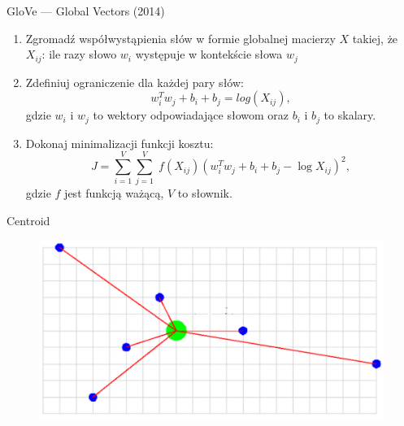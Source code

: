 \documentclass{beamer}
\begin{document}
	\begin{frame}{GloVe --- Global Vectors (2014)}


\begin{enumerate}
	\item Zgromadź współwystąpienia słów w formie globalnej macierzy $X$ takiej, że
	$X_{ij}$: ile razy słowo $w_i$ występuje w kontekście słowa $w_j$

	\item Zdefiniuj ograniczenie dla każdej pary słów: 
	\begin{equation}
	w_i^Tw_j + b_i + b_j = log(X_{ij}),
	\end{equation}
	gdzie $w_i$ i $w_j$ to wektory odpowiadające słowom oraz $b_i$ i $b_j$ to skalary.

	\item Dokonaj minimalizacji funkcji kosztu:
	\begin{equation}
	\label{eq:glove_loss}
	J = \sum_{i=1}^V \sum_{j=1}^V \; f(X_{ij}) ( w_i^T w_j + b_i + b_j - \log X_{ij})^2,
	\end{equation}
	gdzie $f$ jest funkcją ważącą, $V$ to słownik.

\end{enumerate}
	\end{frame}
	\begin{frame}{Centroid}
		\begin{figure}
			\centering
			\includegraphics[width=1\textwidth]{img/centroid.png}
		\end{figure}
	\end{frame}
\end{document}
